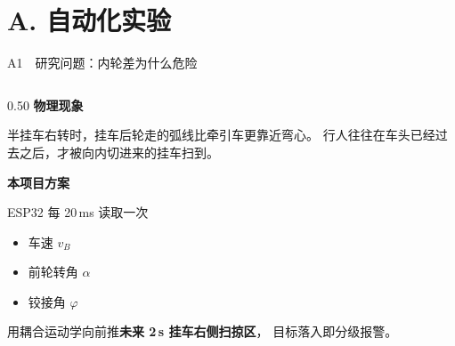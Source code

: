 \documentclass[aspectratio=169,10pt]{ctexbeamer}
\begin{document}
\section{A. 自动化实验}

\begin{frame}{A1\ \ 研究问题：内轮差为什么危险}
  \begin{columns}[T]
    \begin{column}{0.50\textwidth}
      \small
      \textbf{物理现象}\par
      半挂车右转时，挂车后轮走的弧线比牵引车更靠近弯心。
      行人往往在车头已经过去之后，才被向内切进来的挂车扫到。

      \vspace{0.7em}
      \textbf{本项目方案}\par
      ESP32 每 20\,ms 读取一次
      \begin{itemize}\small\setlength{\itemsep}{1pt}
        \item 车速 $v_B$
        \item 前轮转角 $\alpha$
        \item 铰接角 $\varphi$
      \end{itemize}
      用耦合运动学向前推\textbf{未来 2\,s 挂车右侧扫掠区}，
      目标落入即分级报警。


\end{column}
\end{columns}
\end{frame}
\end{document}
